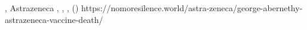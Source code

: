           {, }
          {}
          {Astrazeneca}
          {}
          {
            ,
            ,
            ,
             ()
          }
          {https://nomoresilence.world/astra-zeneca/george-abernethy-astrazeneca-vaccine-death/}


